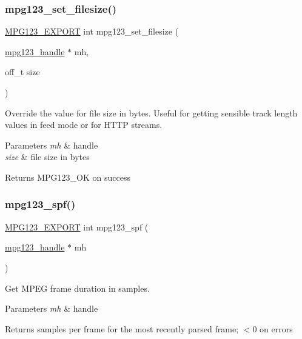 \subsubsection{\texorpdfstring{mpg123\_set\_filesize()}{mpg123\_set\_filesize()}}
{\footnotesize\ttfamily \mbox{\hyperlink{mpg123_8h_a2ba98cfba3f760879df70e755b2a61cc}{M\+P\+G123\+\_\+\+E\+X\+P\+O\+RT}} int mpg123\+\_\+set\+\_\+filesize (\begin{DoxyParamCaption}\item[{\mbox{\hyperlink{group__mpg123__init_ga6728e2839a395f3a07d4514da659faca}{mpg123\+\_\+handle}} $\ast$}]{mh,  }\item[{off\+\_\+t}]{size }\end{DoxyParamCaption})}

Override the value for file size in bytes. Useful for getting sensible track length values in feed mode or for H\+T\+TP streams. 
\begin{DoxyParams}{Parameters}
{\em mh} & handle \\
\hline
{\em size} & file size in bytes \\
\hline
\end{DoxyParams}
\begin{DoxyReturn}{Returns}
M\+P\+G123\+\_\+\+OK on success 
\end{DoxyReturn}
\mbox{\label{group__mpg123__status_ga361e1b936b6dca126ba46e06e06fcc53}} 
\subsubsection{\texorpdfstring{mpg123\_spf()}{mpg123\_spf()}}
{\footnotesize\ttfamily \mbox{\hyperlink{mpg123_8h_a2ba98cfba3f760879df70e755b2a61cc}{M\+P\+G123\+\_\+\+E\+X\+P\+O\+RT}} int mpg123\+\_\+spf (\begin{DoxyParamCaption}\item[{\mbox{\hyperlink{group__mpg123__init_ga6728e2839a395f3a07d4514da659faca}{mpg123\+\_\+handle}} $\ast$}]{mh }\end{DoxyParamCaption})}

Get M\+P\+EG frame duration in samples. 
\begin{DoxyParams}{Parameters}
{\em mh} & handle \\
\hline
\end{DoxyParams}
\begin{DoxyReturn}{Returns}
samples per frame for the most recently parsed frame; $<$0 on errors 
\end{DoxyReturn}
\mbox{\label{group__mpg123__status_ga6edf9556db430445dac2434ed5306a12}} 
